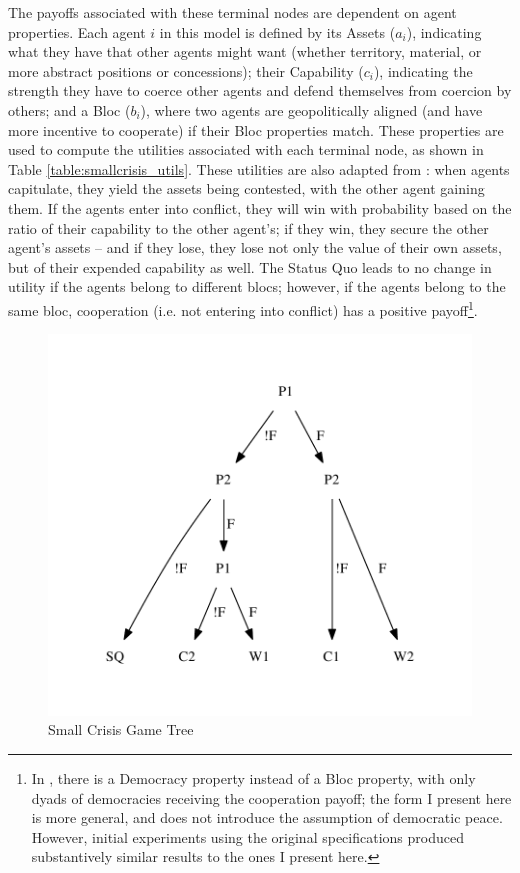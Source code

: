The payoffs associated with these terminal nodes are dependent on agent properties. Each agent $i$ in this model is defined by its Assets ($a_i$), indicating what they have that other agents might want (whether territory, material, or more abstract positions or concessions); their Capability ($c_i$), indicating the strength they have to coerce other agents and defend themselves from coercion by others; and a Bloc ($b_i$), where two agents are geopolitically aligned (and have more incentive to cooperate) if their Bloc properties match. These properties are used to compute the utilities associated with each terminal node, as shown in Table \ref{table:smallcrisis_utils}. These utilities are also adapted from \citet{signorino_1999}: when agents capitulate, they yield the assets being contested, with the other agent gaining them. If the agents enter into conflict, they will win with probability based on the ratio of their capability to the other agent's; if they win, they secure the other agent's assets -- and if they lose, they lose not only the value of their own assets, but of their expended capability as well. The Status Quo leads to no change in utility if the agents belong to different blocs; however, if the agents belong to the same bloc, cooperation (i.e. not entering into conflict) has a positive payoff\footnote{In \cite{signorino_1999}, there is a Democracy property instead of a Bloc property, with only dyads of democracies receiving the cooperation payoff; the form I present here is more general, and does not introduce the assumption of democratic peace. However, initial experiments using the original specifications produced substantively similar results to the ones I present here.}.

\begin{figure}[h!]
    \centering
	\includegraphics[scale=0.75]{WarReason/Figures/SmallCrisisTree}

    \caption[Small Crisis Game Tree]{Small Crisis Game Tree \citep[adapted from][]{signorino_1999}}
    \label{fig:small_crisis_tree}
    \figSpace
\end{figure}



